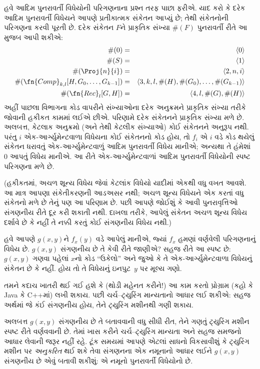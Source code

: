 હવે આદિમ પુનરાવર્તી વિધેયોની પરિગણનાના પ્રશ્ન તરફ પાછા ફરીએ.
યાદ કરો કે દરેક આદિમ પુનરાવર્તી વિધેયને આપણે પ્રતીકાત્મક
સંકેતન આપ્યું છે; તેથી સંકેતનોની પરિગણના કરવી પૂરતી છે. દરેક
સંકેતન $F$ને પ્રાકૃતિક સંખ્યા $\#(F)$ પુનરાવર્તી રીતે આ મુજબ
આપી શકીએ:
\begin{eqnarray*}
\#(0) & = & \langle 0 \rangle \\
\#(S) & = & \langle 1 \rangle \\
\#(\Proj{n}{i}) & = & \langle 2, n, i \rangle \\
\#(\fn{Comp}_{k,l}[H,G_0,\dots,G_{k-1}]) & = & \langle
3,k,l,\#(H),\#(G_0),\dots,\#(G_{k-1}) \rangle \\
\#(\fn{Rec}_l[G,H]) & = & \langle 4, l, \#(G), \#(H) \rangle
\end{eqnarray*}
અહીં પાછલા વિભાગના કોડ વાપરીને સંખ્યાઓના દરેક અનુક્રમને પ્રાકૃતિક
સંખ્યા તરીકે જોવાની હકીકત કામમાં લઈએ છીએ. પરિણામે દરેક સંકેતનને
પ્રાકૃતિક સંખ્યા મળે છે. અલબત્ત, કેટલાક અનુક્રમો (અને તેથી કેટલીક
સંખ્યાઓ) કોઈ સંકેતનને અનુરૂપ નથી. પરંતુ $i$ એક-આર્ગ્યુમેન્ટવાળા
વિધેયના કોઈ સંકેતનનો કોડ
હોય, તો $f_i$ એ $i$ વડે કોડ થયેલું સંકેતન ધરાવતું એક-આર્ગ્યુમેન્ટવાળું આદિમ
પુનરાવર્તી વિધેય માનીએ; અન્યથા તે હંમેશાં $0$ આપતું વિધેય માનીએ.
આ રીતે એક-આર્ગ્યુમેન્ટવાળાં આદિમ પુનરાવર્તી વિધેયોની સ્પષ્ટ
પરિગણના મળે છે.

(હકીકતમાં, અચળ શૂન્ય વિધેય જેવાં કેટલાંક વિધેયો યાદીમાં એકથી વધુ
વખત આવશે. આ માત્ર આપણા સંકેતીકરણની આડઅસર નથી; અચળ શૂન્ય
વિધેયને એક કરતાં વધુ સંકેતનો મળે છે તેનું પણ આ પરિણામ છે.
પછી આપણે જોઈશું કે આવી પુનરાવૃત્તિઓ સંગણનીય રીતે દૂર કરી શકાતી
નથી. દાખલા તરીકે, આપેલું સંકેતન અચળ શૂન્ય વિધેય દર્શાવે છે કે
નહીં તે નક્કી કરતું કોઈ સંગણનીય વિધેય નથી.)

હવે આપણે $g(x,y)$ને $f_x(y)$ વડે આપેલું માનીએ, જ્યાં $f_x$ હમણાં
વર્ણવેલી પરિગણનાનું વિધેય છે. $g(x,y)$ સંગણનીય છે તે કેવી રીતે
જાણીએ? સહજ રીતે આ સ્પષ્ટ છે: $g(x,y)$ ગણવા પહેલાં $x$નો કોડ
``ઉકેલો'' અને જુઓ કે તે એક-આર્ગ્યુમેન્ટવાળા વિધેયનું સંકેતન છે
કે નહીં. હોય તો તે વિધેયનું ઇનપુટ~$y$ પર મૂલ્ય ગણો.


\begin{digress}
તમને કદાચ ખાતરી થઈ ગઈ હશે કે (થોડી મહેનત કરીને!) આ કામ કરતો
પ્રોગ્રામ (કહો કે Java કે C++માં) લખી શકાય. પછી ચર્ચ--ટ્યુરિંગ
માન્યતાનો આધાર લઈ શકીએ: સહજ અર્થમાં જે કંઈ સંગણનીય હોય, તેને
ટ્યુરિંગ મશીનથી ગણી શકાય.

અલબત્ત $g(x,y)$ સંગણનીય છે તે બતાવવાની વધુ સીધી રીત, તેને ગણતું
ટ્યુરિંગ મશીન સ્પષ્ટ રીતે વર્ણવવાની છે. તેમાં ખાસ કરીને
ચર્ચ--ટ્યુરિંગ માન્યતા અને સહજ સમજનો આધાર લેવાની જરૂર નહીં રહે.
ટૂંક સમયમાં આપણે એટલાં સાધનો વિકસાવીશું કે ટ્યુરિંગ મશીન પર
\emph{અનુકરિત} થઈ શકે તેવા સંગણનના એક નમૂનાનો આધાર લઈને
$g(x,y)$ સંગણનીય છે એવું બતાવી શકીશું: એ નમૂનો પુનરાવર્તી
વિધેયોનો છે.
\end{digress}
\endgroup


